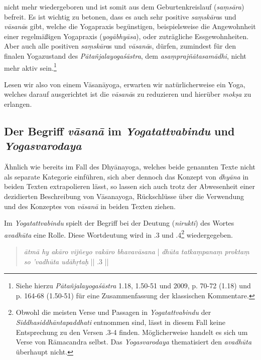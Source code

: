 nicht mehr wiedergeboren und ist somit aus dem Geburtenkreislauf (\textit{saṃsāra}) befreit. Es ist wichtig zu betonen, dass es auch sehr positive \textit{saṃskāra}s und \textit{vāsanā}s gibt, welche die Yogapraxis begünstigen, beispielsweise die Angewohnheit einer regelmäßigen Yogapraxis (\textit{yogābhyāsa}), oder zuträgliche Essgewohnheiten. Aber auch alle positiven \textit{saṃskāra}s und \textit{vāsanā}s, dürfen, zumindest für den finalen Yogazustand des \textit{Pātañjalayogaśāstra}, dem \textit{asaṃprajñātasamādhi}, nicht mehr aktiv sein.\footnote{Siehe hierzu \textit{Pātañjalayogaśāstra} 1.18, 1.50-51 und \citeauthor{bryant2009} 2009, p. 70-72 (1.18) und p. 164-68 (1.50-51) für eine Zusammenfassung der klassischen Kommentare.}  

Lesen wir also von einem Vāsanāyoga, erwarten wir natürlicherweise ein Yoga, welches darauf ausgerichtet ist die \textit{vāsanā}s zu reduzieren und hierüber \textit{mokṣa} zu erlangen.

\subsection{Der Begriff \textit{vāsanā} im \textit{Yogatattvabindu} und \textit{Yogasvarodaya}}

Ähnlich wie bereits im Fall des Dhyānayoga, welches beide genannten Texte nicht als separate Kategorie einführen, sich aber dennoch das Konzept von \textit{dhyāna} in beiden Texten extrapolieren lässt, so lassen sich auch trotz der Abwesenheit einer dezidierten Beschreibung von Vāsanayoga, Rückschlüsse über die Verwendung und des Konzeptes von \textit{vāsanā} in beiden Texten ziehen.

Im \textit{Yogatattvabindu} spielt der Begriff bei der Deutung (\textit{nirukti}) des Wortes \textit{avadhūta} eine Rolle. Diese Wortdeutung wird in .3 und .4\footnote{Obwohl die meisten Verse und Passagen in \textit{Yogatattvabindu}  der \textit{Siddhasiddhāntapaddhati} entnommen sind, lässt in diesem Fall keine Entsprechung zu den Versen .3-4 finden. Möglicherweise handelt es sich um Verse von Rāmacandra selbst. Das \textit{Yogasvarodaya} thematisiert den \textit{avadhūta} überhaupt nicht.} wiedergegeben.

\begin{quote}
  \textit{ātmā hy akāro vijñeyo vakāro bhavavāsana} |
  \textit{dhūta tatkaṃpanaṃ proktaṃ so 'vadhūta udāhṛtaḥ} || .3 ||
\end{quote}

